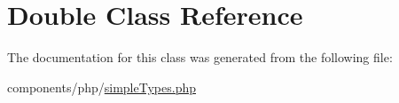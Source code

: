 \hypertarget{class_double}{
\section{Double Class Reference}
\label{class_double}
}


The documentation for this class was generated from the following file:\begin{CompactItemize}
\item 
components/php/\hyperlink{simple_types_8php}{simpleTypes.php}\end{CompactItemize}
